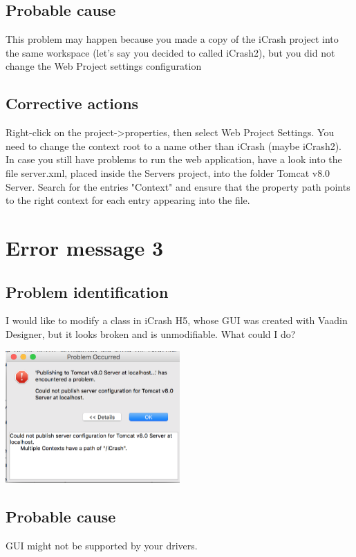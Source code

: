 \subsection{Probable cause}
This problem may happen because you made a copy of the iCrash project into the
same workspace (let's say you decided to called iCrash2), but you did not change
the Web Project settings configuration\\

\subsection{Corrective actions}
Right-click on the project->properties, then select Web Project Settings. You
need to change the context root to a name other than iCrash (maybe iCrash2).\\
In case you still have problems to run the web application, have a look into the file server.xml, placed inside the Servers project, into the folder Tomcat v8.0 Server. Search for the entries "Context" and ensure that the property path points to the right context for each entry appearing into the file.
 

\section{Error message 3}

\subsection{Problem identification}
I would like to modify a class in iCrash H5, whose GUI was created with Vaadin
Designer, but it looks broken and is unmodifiable. What could I do?\\
\begin{center}
\includegraphics[width=0.5\textwidth]{./images/er2.eps}
\end{center}

\subsection{Probable cause}
GUI might not be supported by your drivers.
 

